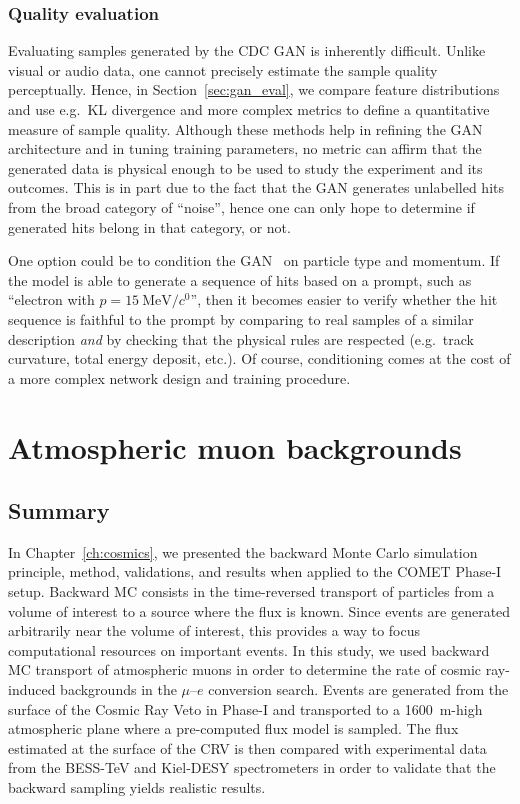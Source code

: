\subsubsection{Quality evaluation}

Evaluating samples generated by the CDC GAN is inherently difficult. Unlike
visual or audio data, one cannot precisely estimate the sample quality
perceptually. Hence, in Section~\ref{sec:gan_eval}, we compare feature
distributions and use e.g.\ KL divergence and more complex metrics to define a
quantitative measure of sample quality. Although these methods help in refining
the GAN architecture and in tuning training parameters, no metric can affirm
that the generated data is physical enough to be used to study the experiment
and its outcomes. This is in part due to the fact that the GAN generates
unlabelled hits from the broad category of ``noise'', hence one can only hope to
determine if generated hits belong in that category, or not.

One option could be to condition the GAN~\cite{Mirza2014ConditionalGA} on
particle type and momentum. If the model is able to generate a sequence of hits
based on a prompt, such as ``electron with $p=\SI{15}{\MeV/\clight}$'', then it
becomes easier to verify whether the hit sequence is faithful to the prompt by
comparing to real samples of a similar description \emph{and} by checking that
the physical rules are respected (e.g.\ track curvature, total energy deposit,
etc.). Of course, conditioning comes at the cost of a more complex network
design and training procedure.



\section{Atmospheric muon backgrounds}

\subsection{Summary}
In Chapter~\ref{ch:cosmics}, we presented the backward Monte Carlo simulation
principle, method, validations, and results when applied to the COMET Phase-I
setup. Backward MC consists in the time-reversed transport of particles from a
volume of interest to a source where the flux is known. Since events are
generated arbitrarily near the volume of interest, this provides a way to focus
computational resources on important events. In this study, we used backward MC
transport of atmospheric muons in order to determine the rate of cosmic
ray-induced backgrounds in the $\mu$--$e$ conversion search. Events are
generated from the surface of the Cosmic Ray Veto in Phase-I and transported to
a \SI{1600}{\metre}-high atmospheric plane where a pre-computed flux model is
sampled. The flux estimated at the surface of the CRV is then compared with
experimental data from the BESS-TeV and Kiel-DESY spectrometers in order to
validate that the backward sampling yields realistic results. 

